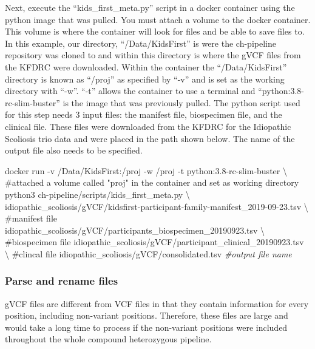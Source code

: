 \documentclass[]{article}
\newenvironment{Shaded}{\begin{snugshade}}{\end{snugshade}}
\newcommand{\CommentTok}[1]{\textcolor[rgb]{0.56,0.35,0.01}{\textit{#1}}}
\newcommand{\DataTypeTok}[1]{\textcolor[rgb]{0.13,0.29,0.53}{#1}}
\newcommand{\ExtensionTok}[1]{#1}
\newcommand{\NormalTok}[1]{#1}
\newcommand{\StringTok}[1]{\textcolor[rgb]{0.31,0.60,0.02}{#1}}
\begin{document}
Next, execute the ``kids\_first\_meta.py'' script in a docker container
using the python image that was pulled. You must attach a volume to the
docker container. This volume is where the container will look for files
and be able to save files to. In this example, our directory,
``/Data/KidsFirst'' is were the ch-pipeline repository was cloned to and
within this directory is where the gVCF files from the KFDRC were
downloaded. Within the container the ``/Data/KidsFirst'' directory is
known as ``/proj'' as specified by ``-v'' and is set as the working
directory with ``-w''. ``-t'' allows the container to use a terminal and
``python:3.8-rc-slim-buster'' is the image that was previously pulled.
The python script used for this step needs 3 input files: the manifest
file, biospecimen file, and the clinical file. These files were
downloaded from the KFDRC for the Idiopathic Scoliosis trio data and
were placed in the path shown below. The name of the output file also
needs to be specified.

\begin{Shaded}
\begin{Highlighting}[]
\ExtensionTok{docker}\NormalTok{ run -v /Data/KidsFirst:/proj -w /proj -t python:3.8-rc-slim-buster }\DataTypeTok{\textbackslash{} }\NormalTok{#attached a volume called }\StringTok{"proj"}\NormalTok{ in the container and set as working directory}
  \ExtensionTok{python3}\NormalTok{ ch-pipeline/scripts/kids_first_meta.py \textbackslash{}}
\NormalTok{  idiopathic_scoliosis/gVCF/kidsfirst-participant-family-manifest_2019-09-23.tsv }\DataTypeTok{\textbackslash{} }\NormalTok{#manifest file}
  \ExtensionTok{idiopathic_scoliosis/gVCF/participants_biospecimen_20190923.tsv} \DataTypeTok{\textbackslash{} }\NormalTok{#biospecimen file}
  \ExtensionTok{idiopathic_scoliosis/gVCF/participant_clinical_20190923.tsv} \DataTypeTok{\textbackslash{} }\NormalTok{#clincal file}
  \ExtensionTok{idiopathic_scoliosis/gVCF/consolidated.tsv} \CommentTok{#output file name}
\end{Highlighting}
\end{Shaded}

\hypertarget{parse-and-rename-files}{%
\subsubsection{Parse and rename files}\label{parse-and-rename-files}}

gVCF files are different from VCF files in that they contain information
for every position, including non-variant positions. Therefore, these
files are large and would take a long time to process if the non-variant
positions were included throughout the whole compound heterozygous
pipeline.
\end{document}
